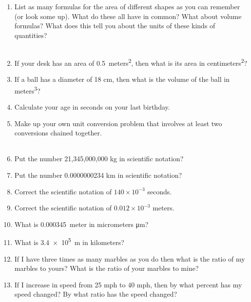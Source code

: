 \begin{enumerate}
\item
List as many formulas for the area of different shapes as you can remember (or look some up). What do these all have in common? What about volume formulas? What does this tell you about the units of these kinds of quantities?\\
\\


\item 
If your desk has an area of \SI{0.5}{meters^2}, then what is its area in \si{centimeters^2}?\\

\item 
If a ball has a diameter of 18 cm, then what is the volume of the ball in \si{meters^3}?\\

\item Calculate your age in seconds on your last birthday.

\item 
Make up your own unit conversion problem that involves at least two conversions chained together.\\
\\

\item 
Put the number 21,345,000,000 kg in scientific notation?\\

\item 
Put the number 0.0000000234 km in scientific notation?\\

\item 
Correct the scientific notation of $140\times10^{-3}$ seconds.

\item 
Correct the scientific notation of $0.012\times10^{-3}$ meters.

\item 
What is \SI{0.000345}{meter} in micrometers \si{\um}?

\item 
What is \SI{3.4e5}{\meter} in kilometers?

\item 
If I have three times as many marbles as you do then what is the ratio of my marbles to yours? What is the ratio of your marbles to mine?


\item If I increase in speed from 25 mph to 40 mph, then by what percent has my speed changed? By what ratio has the speed changed?\\


\end{enumerate}
